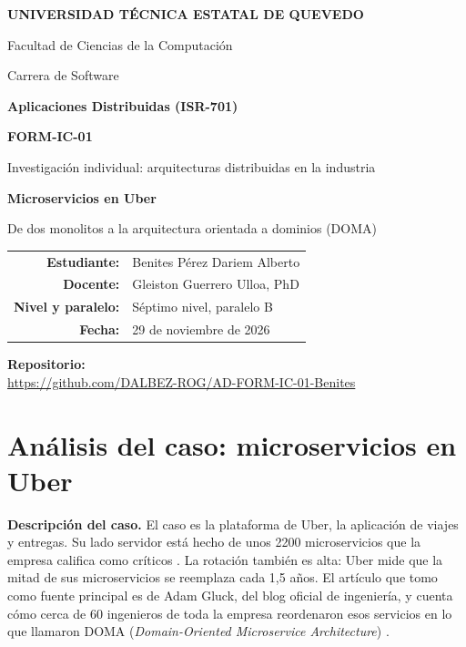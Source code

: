 \documentclass[11pt,a4paper]{article}
\newcommand{\repourl}{https://github.com/DALBEZ-ROG/AD-FORM-IC-01-Benites}
\newcommand{\apartado}[1]{\par\vspace{3pt}\noindent\textbf{#1}\quad}
\begin{document}
\begin{titlepage}
\centering
{\Large\bfseries UNIVERSIDAD TÉCNICA ESTATAL DE QUEVEDO\par}
\vspace{4pt}
{\large Facultad de Ciencias de la Computación\par}
{\large Carrera de Software\par}
\vspace{2cm}
{\large\bfseries Aplicaciones Distribuidas (ISR-701)\par}
\vspace{1cm}
{\Large\bfseries FORM-IC-01\par}
\vspace{4pt}
{\large Investigación individual: arquitecturas distribuidas en la industria\par}
\vspace{1.2cm}
{\LARGE\bfseries Microservicios en Uber\par}
\vspace{4pt}
{\large De dos monolitos a la arquitectura orientada a dominios (DOMA)\par}
\vfill
\renewcommand{\arraystretch}{1.5}
\begin{tabular}{>{\bfseries}r l}
  Estudiante: & Benites Pérez Dariem Alberto \\
  Docente: & Gleiston Guerrero Ulloa, PhD \\
  Nivel y paralelo: & Séptimo nivel, paralelo B \\
  Fecha: & 29 de noviembre de 2026 \\
\end{tabular}
\vfill
{\bfseries Repositorio:}\\[4pt]
{\small\url{\repourl}}
\end{titlepage}

\section*{Análisis del caso: microservicios en Uber}

\apartado{Descripción del caso.}
El caso es la plataforma de Uber, la aplicación de viajes y entregas. Su lado servidor está hecho de unos 2200 microservicios que la empresa califica como críticos \cite{gluck2020}. La rotación también es alta: Uber mide que la mitad de sus microservicios se reemplaza cada 1,5 años. El artículo que tomo como fuente principal es de Adam Gluck, del blog oficial de ingeniería, y cuenta cómo cerca de 60 ingenieros de toda la empresa reordenaron esos servicios en lo que llamaron DOMA (\emph{Domain-Oriented Microservice Architecture}) \cite{gluck2020}.
\end{document}
